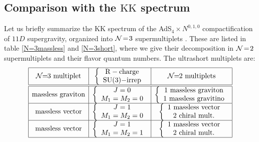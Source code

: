 \documentclass[a4paper,12pt]{article}
\def\n010{N^{0,1,0}}
\begin{document}
\subsection{Comparison with the $\mathrm{KK}$ spectrum}
Let us briefly summarize the $\mathrm{KK}$ spectrum of the
AdS$_4\times \n010$ compactification of $11D$ supergravity, organized
into ${\cal N}\!=\!3$ supermultiplets \cite{n010massspectrum,osp34}.
These are listed in table \ref{N=3massless} and \ref{N=3short},
where we give their decomposition in ${\cal N}\!=\!2$
supermultiplets and their flavor quantum numbers.
The ultrashort multiplets are:
\begin{equation}
\begin{array}{|c|c|c|}
\hline
{\cal N}\!\!=\!\!3\ {\rm multiplet}&
\left\{\begin{array}{c}
{\rm R-charge}\\
\mathrm{SU(3)}{\rm -irrep}
\end{array}\right.&
{\cal N}\!\!=\!\!2\ {\rm multiplets}\\
\hline
\hline
{\rm massless\ graviton}&
\left\{\begin{array}{c}
J=0\\
M_1=M_2=0
\end{array}\right.&
\left\{\begin{array}{c}
1\ {\rm massless\ graviton}\\
1\ {\rm massless\ gravitino}
\end{array}\right.\\
\hline
{\rm massless\ vector}&
\left\{\begin{array}{c}
J=1\\
M_1=M_2=0
\end{array}\right.&
\left\{\begin{array}{c}
1\ {\rm massless\ vector}\\
2\ {\rm chiral\ mult.}
\end{array}\right.\\
\hline
{\rm massless\ vector}&
\left\{\begin{array}{c}
J=1\\
M_1=M_2=1
\end{array}\right.&
\left\{\begin{array}{c}
1\ {\rm massless\ vector}\\
2\ {\rm chiral\ mult.}
\end{array}\right.\\
\hline
\end{array}\label{N=3massless}
\end{equation}
\end{document}
